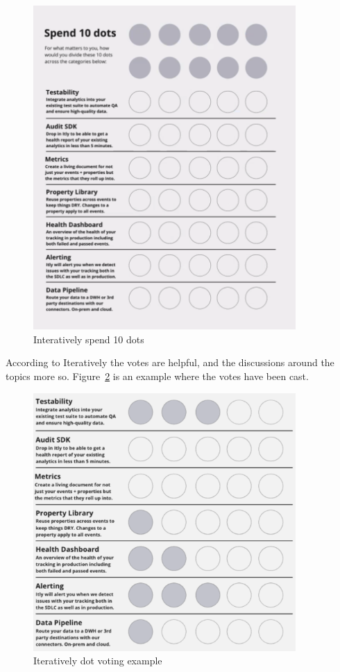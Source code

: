 \begin{figure}[htbp!]
    \centering
    \includegraphics[width=10cm]{images/iteratively/spend-10-dots.png}
    \caption{Interatively spend 10 dots}
    \label{fig:iteratively-spend-10-dots}
\end{figure}

According to Iteratively the votes are helpful, and the discussions around the topics more so.  Figure~\ref{fig:iteratively-dot-voting-example} is an example where the votes have been cast. 

\begin{figure}[htbp!]
    \centering
    \includegraphics[width=10cm]{images/iteratively/dot-voting-example.png}
    \caption{Iteratively dot voting example}
    \label{fig:iteratively-dot-voting-example}
\end{figure}


